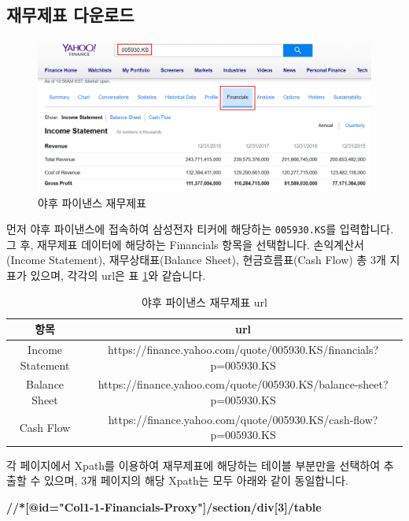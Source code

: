 \documentclass[12pt,]{book}
\newenvironment{Shaded}{\begin{snugshade}}{\end{snugshade}}
\newcommand{\ErrorTok}[1]{\textcolor[rgb]{0.64,0.00,0.00}{\textbf{#1}}}
\begin{document}
\hypertarget{section-32}{%
\subsection{재무제표 다운로드}\label{section-32}}

\begin{figure}[h]

{\centering \includegraphics[width=0.7\linewidth]{images/crawl_practice_yahoo} 

}

\caption{야후 파이낸스 재무제표}\label{fig:unnamed-chunk-29}
\end{figure}

먼저 야후 파이낸스에 접속하여 삼성전자 티커에 해당하는 \texttt{005930.KS}를 입력합니다. 그 후, 재무제표 데이터에 해당하는 Financials 항목을 선택합니다. 손익계산서(Income Statement), 재무상태표(Balance Sheet), 현금흐름표(Cash Flow) 총 3개 지표가 있으며, 각각의 url은 표 \ref{tab:yahoofs}와 같습니다.

\begin{table}[!h]

\caption{\label{tab:yahoofs}야후 파이낸스 재무제표 url}
\centering
\fontsize{7}{9}\selectfont
\begin{tabular}{cc}
\toprule
항목 & url\\
\midrule
\rowcolor{gray!6}  Income Statement & https://finance.yahoo.com/quote/005930.KS/financials?p=005930.KS\\
Balance Sheet & https://finance.yahoo.com/quote/005930.KS/balance-sheet?p=005930.KS\\
\rowcolor{gray!6}  Cash Flow & https://finance.yahoo.com/quote/005930.KS/cash-flow?p=005930.KS\\
\bottomrule
\end{tabular}
\end{table}

각 페이지에서 Xpath를 이용하여 재무제표에 해당하는 테이블 부분만을 선택하여 추출할 수 있으며, 3개 페이지의 해당 Xpath는 모두 아래와 같이 동일합니다.

\begin{Shaded}
\begin{Highlighting}[]
\ErrorTok{//*[@id="Col1-1-Financials-Proxy"]/section/div[3]/table}
\end{Highlighting}
\end{Shaded}
\end{document}
